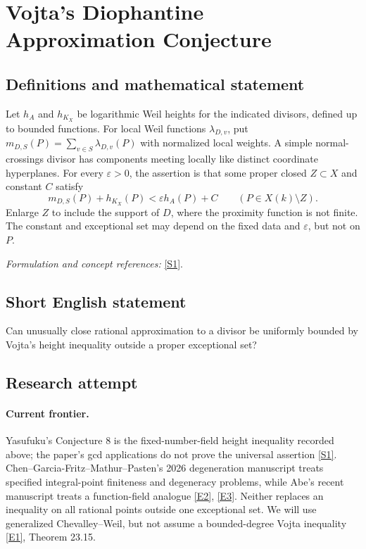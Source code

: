 \documentclass[11pt,a4paper]{article}
\newcommand{\sref}[2]{\hyperlink{source:#1:#2}{[S#2]}}
\newcommand{\eref}[2]{\hyperlink{extra:#1:#2}{[E#2]}}
\newif\ifshowcatalogue
\newcommand{\cataloguescope}[1]{\ifshowcatalogue
 \paragraph{Exact scope in the supplied catalogue.}
 \begin{quote}\small #1\end{quote}\fi}
\numberwithin{equation}{section}
\begin{document}
\setcounter{section}{0}
\clearpage
\section*{\texorpdfstring{Vojta's Diophantine Approximation Conjecture}{Vojta's Diophantine Approximation Conjecture}}\label{statement}
\subsection{Definitions and mathematical statement}
Let $h_A$ and $h_{K_X}$ be logarithmic Weil heights for the indicated divisors, defined up to bounded functions. For local Weil functions $\lambda_{D,v}$, put $m_{D,S}(P)=\sum_{v\in S}\lambda_{D,v}(P)$ with normalized local weights. A simple normal-crossings divisor has components meeting locally like distinct coordinate hyperplanes. For every $\varepsilon>0$, the assertion is that some proper closed $Z\subset X$ and constant $C$ satisfy
\[
 m_{D,S}(P)+h_{K_X}(P)<\varepsilon h_A(P)+C
 \qquad(P\in X(k)\setminus Z).
\]
Enlarge $Z$ to include the support of $D$, where the proximity function is not finite. The constant and exceptional set may depend on the fixed data and $\varepsilon$, but not on $P$.
\par\smallskip\textit{Formulation and concept references:} \sref{statement}{1}.
\cataloguescope{Let k be a number field, X a smooth projective variety over k, K\_X a canonical divisor, A an ample divisor, D an effective simple normal-crossings divisor, and S a finite set of places containing the archimedean places. Prove that for every epsilon > 0 there are a proper Zariski-closed subset Z of X and a constant C such that m\_\{D,S\}(P)+h\_\{K\_X\}(P) < epsilon h\_A(P)+C for every P in X(k) outside Z.}
\subsection{Short English statement}
Can unusually close rational approximation to a divisor be uniformly bounded by Vojta's height inequality outside a proper exceptional set?
\subsection{Research attempt}

\paragraph{Current frontier.}
Yasufuku's Conjecture 8 is the fixed-number-field height inequality recorded above; the paper's gcd applications do not prove the universal assertion \sref{statement}{1}. Chen--Garcia-Fritz--Mathur--Pasten's 2026 degeneration manuscript treats specified integral-point finiteness and degeneracy problems, while Abe's recent manuscript treats a function-field analogue \eref{statement}{2}, \eref{statement}{3}. Neither replaces an inequality on all rational points outside one exceptional set. We will use generalized Chevalley--Weil, but not assume a bounded-degree Vojta inequality \eref{statement}{1}, Theorem 23.15.
\end{document}
